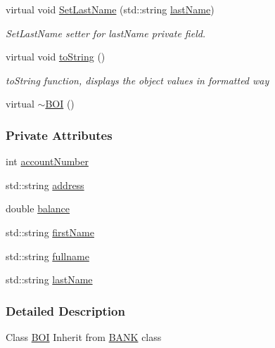 \begin{DoxyCompactItemize}
virtual void \hyperlink{class_b_o_i_a663906e9a59ffa970fb928746c01e8af_a663906e9a59ffa970fb928746c01e8af}{Set\+Last\+Name} (std\+::string \hyperlink{class_b_o_i_ad51bfa6f28816c7f5036447ff809cecf_ad51bfa6f28816c7f5036447ff809cecf}{last\+Name})
\begin{DoxyCompactList}\small\item\em Set\+Last\+Name setter for last\+Name private field. \end{DoxyCompactList}\item 
virtual void \hyperlink{class_b_o_i_ab02a4dd4ebcc5b2abfaca19f2dff2006_ab02a4dd4ebcc5b2abfaca19f2dff2006}{to\+String} ()
\begin{DoxyCompactList}\small\item\em to\+String function, displays the object values in formatted way \end{DoxyCompactList}\item 
virtual \hyperlink{class_b_o_i_a617f46a599129178c6b11b4846759a6c_a617f46a599129178c6b11b4846759a6c}{$\sim$\+B\+OI} ()
\end{DoxyCompactItemize}
\subsubsection*{Private Attributes}
\begin{DoxyCompactItemize}
\item 
int \hyperlink{class_b_o_i_a35c9fd6e938eb44ad4e076bc6a736851_a35c9fd6e938eb44ad4e076bc6a736851}{account\+Number}
\item 
std\+::string \hyperlink{class_b_o_i_ab9315fe76fd9f07551f5ae7899d33516_ab9315fe76fd9f07551f5ae7899d33516}{address}
\item 
double \hyperlink{class_b_o_i_aa00a3d8baf3420647c40119b7fa4ed6f_aa00a3d8baf3420647c40119b7fa4ed6f}{balance}
\item 
std\+::string \hyperlink{class_b_o_i_a12872fd8c15dbf833f78862b00579ed1_a12872fd8c15dbf833f78862b00579ed1}{first\+Name}
\item 
std\+::string \hyperlink{class_b_o_i_a6d7c892a54bb6f7327cdc777081ab5f4_a6d7c892a54bb6f7327cdc777081ab5f4}{fullname}
\item 
std\+::string \hyperlink{class_b_o_i_ad51bfa6f28816c7f5036447ff809cecf_ad51bfa6f28816c7f5036447ff809cecf}{last\+Name}
\end{DoxyCompactItemize}


\subsubsection{Detailed Description}
Class \hyperlink{class_b_o_i}{B\+OI} Inherit from \hyperlink{class_b_a_n_k}{B\+A\+NK} class 

